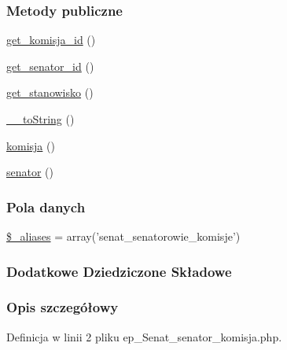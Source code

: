 \subsubsection*{Metody publiczne}
\begin{DoxyCompactItemize}
\item 
\hyperlink{classep___senat__senator__komisja_ad690400f135a1256aca1fec359aed14f}{get\-\_\-komisja\-\_\-id} ()
\item 
\hyperlink{classep___senat__senator__komisja_aa0c141b1e9aba9fed3eb13ed8901de76}{get\-\_\-senator\-\_\-id} ()
\item 
\hyperlink{classep___senat__senator__komisja_a24e5fcbf4661581e53314bf23f908b7a}{get\-\_\-stanowisko} ()
\item 
\hyperlink{classep___senat__senator__komisja_a7516ca30af0db3cdbf9a7739b48ce91d}{\-\_\-\-\_\-to\-String} ()
\item 
\hyperlink{classep___senat__senator__komisja_a1d71a6ebf9406f2a818e18f4df5a5728}{komisja} ()
\item 
\hyperlink{classep___senat__senator__komisja_af076312b536f7707cda87563bd9113d9}{senator} ()
\end{DoxyCompactItemize}
\subsubsection*{Pola danych}
\begin{DoxyCompactItemize}
\item 
\hyperlink{classep___senat__senator__komisja_ab4e31d75f0bc5d512456911e5d01366b}{\$\-\_\-aliases} = array('senat\-\_\-senatorowie\-\_\-komisje')
\end{DoxyCompactItemize}
\subsubsection*{Dodatkowe Dziedziczone Składowe}


\subsubsection{Opis szczegółowy}


Definicja w linii 2 pliku ep\-\_\-\-Senat\-\_\-senator\-\_\-komisja.\-php.



